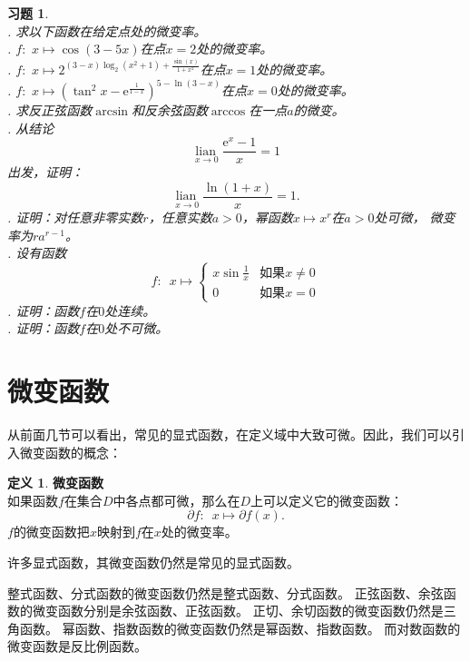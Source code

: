 \documentclass[12pt,UTF8]{ctexbook}
\newcommand{\lian}[1]{
    \underset{#1}{\operatorname{lian}\,}
}
\theoremstyle{definition}
\newtheorem{df}{定义}[section]
\theoremstyle{plain}
\newtheorem{xt}{习题}[section]
\begin{document}
\begin{xt}
    \mbox{} \\
    . 求以下函数在给定点处的微变率。\\
    . $f: \,\, x \mapsto \cos{(3 - 5x)}$在点$x = 2$处的微变率。\\
    . $f: \,\, x \mapsto 2^{(3 - x)\log_2\left(x^2 + 1\right) + \frac{\sin(x)}{1 + x^2}}$在点$x = 1$处的微变率。\\
    . $f: \,\, x \mapsto (\tan^2{x} - \mathrm{e}^{\frac{1}{1-x}})^{5 - \ln(3 - x)}$在点$x = 0$处的微变率。\\
    . 求反正弦函数$\arcsin$和反余弦函数$\arccos$在一点$a$的微变。\\
    . 从结论
    $$ \lian{x\to 0} \frac{\mathrm{e}^x - 1}{x} = 1$$
    \indent 出发，证明：
    $$ \lian{x\to 0} \frac{\ln{(1 + x)}}{x} = 1.$$
    . 证明：对任意非零实数$r$，任意实数$a>0$，幂函数$x \mapsto x^r$在$a>0$处可微，
    微变率为$ra^{r-1}$。\\
    . 设有函数
    $$f: \,\,\, x \mapsto \left\{
        \begin{array}{cl}
            x\sin{\frac{1}{x}}  & \mbox{如果}x \neq 0 \\
            0 & \mbox{如果}x = 0
        \end{array}\right.
    $$
    . 证明：函数$f$在$0$处连续。\\
    . 证明：函数$f$在$0$处不可微。
\end{xt}

\section{微变函数}
从前面几节可以看出，常见的显式函数，在定义域中大致可微。因此，我们可以引入微变函数的概念：
\begin{df}{\textbf{微变函数}}\label{df:2-4-0}
    \mbox{} \\
    如果函数$f$在集合$D$中各点都可微，那么在$D$上可以定义它的微变函数：
    $$ \partial f : \,\,\, x \mapsto \partial f(x). $$
    $f$的微变函数把$x$映射到$f$在$x$处的微变率。
\end{df}

许多显式函数，其微变函数仍然是常见的显式函数。

整式函数、分式函数的微变函数仍然是整式函数、分式函数。
正弦函数、余弦函数的微变函数分别是余弦函数、正弦函数。
正切、余切函数的微变函数仍然是三角函数。
幂函数、指数函数的微变函数仍然是幂函数、指数函数。
而对数函数的微变函数是反比例函数。
\end{document}

